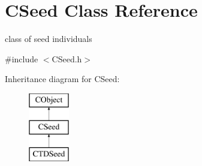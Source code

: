 \hypertarget{class_c_seed}{}\section{C\+Seed Class Reference}
\label{class_c_seed}


class of seed individuals  




{\ttfamily \#include $<$C\+Seed.\+h$>$}

Inheritance diagram for C\+Seed\+:\begin{figure}[H]
\begin{center}
\leavevmode
\includegraphics[height=3.000000cm]{class_c_seed}
\end{center}
\end{figure}

